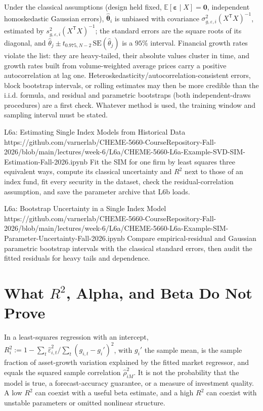 \documentclass[11pt]{article}
\newcommand{\E}{\mathbb{E}}
\begin{document}
Under the classical assumptions (design held fixed, $\E[\boldsymbol\varepsilon\mid X]=\mathbf0$, independent homoskedastic Gaussian errors), $\widehat{\boldsymbol\theta}_i$ is unbiased with covariance $\sigma_{g,\varepsilon,i}^2(X^{\mathsf T}X)^{-1}$, estimated by $s_{g,\varepsilon,i}^2(X^{\mathsf T}X)^{-1}$; the standard errors are the square roots of its diagonal, and $\hat\theta_j\pm t_{0.975,N-2}\,\mathrm{SE}(\hat\theta_j)$ is a $95\%$ interval. Financial growth rates violate the list: they are heavy-tailed, their absolute values cluster in time, and growth rates built from volume-weighted average prices carry a positive autocorrelation at lag one. Heteroskedasticity/autocorrelation-consistent errors, block bootstrap intervals, or rolling estimates may then be more credible than the i.i.d. formula, and residual and parametric bootstraps (both independent-draws procedures) are a first check. Whatever method is used, the training window and sampling interval must be stated.

\notebooklink
  {L6a: Estimating Single Index Models from Historical Data}
  {https://github.com/varnerlab/CHEME-5660-CourseRepository-Fall-2026/blob/main/lectures/week-6/L6a/CHEME-5660-L6a-Example-SVD-SIM-Estimation-Fall-2026.ipynb}
  {Fit the SIM for one firm by least squares three equivalent ways, compute its classical uncertainty and $R^2$ next to those of an index fund, fit every security in the dataset, check the residual-correlation assumption, and save the parameter archive that L6b loads.}

\notebooklink
  {L6a: Bootstrap Uncertainty in a Single Index Model}
  {https://github.com/varnerlab/CHEME-5660-CourseRepository-Fall-2026/blob/main/lectures/week-6/L6a/CHEME-5660-L6a-Example-SIM-Parameter-Uncertainty-Fall-2026.ipynb}
  {Compare empirical-residual and Gaussian parametric bootstrap intervals with the classical standard errors, then audit the fitted residuals for heavy tails and dependence.}

\section{What \texorpdfstring{$R^2$}{R-squared}, Alpha, and Beta Do Not Prove}

In a least-squares regression with an intercept, $R_i^2:=1-\sum_t\widehat\varepsilon_{i,t}^2/\sum_t(g_{i,t}-g_i')^2$, with $g_i'$ the sample mean, is the sample fraction of asset-growth variation explained by the fitted market regressor, and equals the squared sample correlation $\hat\rho_{iM}^2$. It is not the probability that the model is true, a forecast-accuracy guarantee, or a measure of investment quality. A low $R^2$ can coexist with a useful beta estimate, and a high $R^2$ can coexist with unstable parameters or omitted nonlinear structure.
\end{document}
